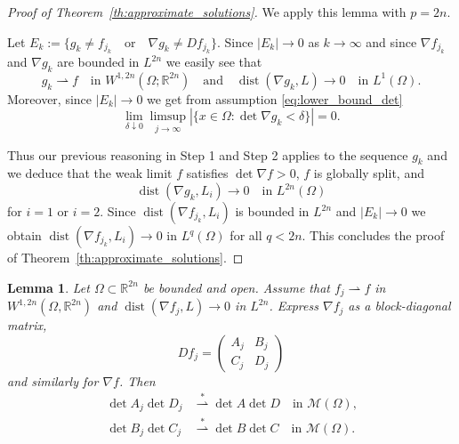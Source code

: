 \documentclass[titlepage]{amsart}
\numberwithin{equation}{section}
\theoremstyle{plain}
\newtheorem{lemma}[equation]{Lemma}
\theoremstyle{definition}
\theoremstyle{remark}
\newcommand{\dist}{\operatorname{dist}}
\newcommand{\R}{\mathbb{R}}
\newcommand{\g}{\nabla }
\begin{document}
\begin{proof}[Proof of Theorem~\ref{th:approximate_solutions}]
We apply this lemma with $p = 2n$.

Let $E_k := \{ g_k \ne f_{j_k}  \quad \text{or}  \quad \g g_k \ne Df_{j_k} \}$. Since $|E_k| \to 0$ as $k \to \infty$ and since $\g f_{j_k}$
and $\g g_k$ are bounded in $L^{2n}$   we easily see that 
$$ g_k \rightharpoonup f \quad \text{in $W^{1,2n}(\Omega; \R^{2n})$} \quad \text{and} 
\quad \dist(\g g_k, L) \to 0 \quad \text{in $L^1(\Omega)$}.$$
Moreover, since $|E_k| \to 0$ we get from  assumption   \eqref{eq:lower_bound_det}
$$ \lim_{\delta \downarrow 0} \limsup_{j \to \infty}  |\{ x \in \Omega : \det \g g_k < \delta \} | = 0.$$


Thus our previous reasoning in Step 1 and Step 2  applies to the sequence  $g_k$  and we deduce that the  weak limit $f$ satisfies $\det \g f > 0$,
$f$ is globally split, and 
$$ \dist(\g g_k, L_i) \to 0 \quad \text{in $L^{2n}(\Omega)$} $$
for $i=1$ or $i=2$.
Since $\dist(\g f_{j_k}, L_i)$ is bounded in $L^{2n}$ and $|E_k| \to 0$ we obtain
$\dist(\g f_{j_k}, L_i) \to 0$ in $L^q(\Omega)$ for all $q < 2n$. This concludes the proof of 
Theorem~\ref{th:approximate_solutions}.
\end{proof}


 

 

 
 

\begin{lemma} \label{le:cc}
Let $\Omega \subset \R^{2n}$ be bounded and open. Assume that $f_j \rightharpoonup f$ in $W^{1,2n}(\Omega, \R^{2n})$
and $\dist(\g f_j, L) \to 0$ in $L^{2n}$. Express $\g f_j$ as a block-diagonal matrix,
$$ Df_j = \begin{pmatrix} A_j & B_j \\ C_j & D_j  \end{pmatrix}$$
and similarly for $\g f$. Then
\begin{eqnarray} \label{eq:weak_continuity_detA_detD}
\det A_j \det D_j &\overset{*}{\rightharpoonup} \det A \det D     \quad \text{in $\mathcal M(\Omega)$,} \\
\det B_j \det C_j &\overset{*}{\rightharpoonup} \det B \det C  \label{eq:weak_continuity_detB_detC}
 \quad \text{in $\mathcal M(\Omega)$.}
\end{eqnarray}
\end{lemma}
\end{document}
